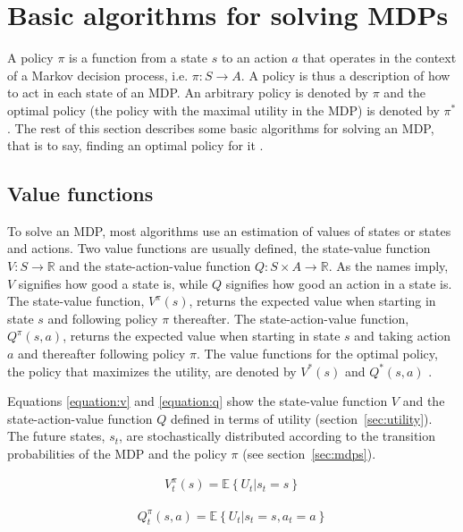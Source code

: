 \section{Basic algorithms for solving MDPs}

A policy $\pi$ is a function from a state $s$ to an action $a$ that operates in
the context of a Markov decision process, i.e. $\pi \colon S \to A$. A policy
is thus a description of how to act in each state of an MDP. An arbitrary
policy is denoted by $\pi$ and the optimal policy (the policy with the maximal
utility in the MDP) is denoted by $\pi^*$. The rest of this section
describes some basic algorithms for solving an MDP, that is to say, finding an optimal
policy for it \parencite{barto1998reinforcement}.

\subsection{Value functions}

To solve an MDP, most algorithms use an estimation of values of states or
states and actions. Two value functions are usually defined, the state-value function $V :
S \to \mathbb R$ and the state-action-value function $Q : S \times A \to
\mathbb R$. As the names imply, $V$ signifies how good a state is, while $Q$
signifies how good an action in a state is. The state-value function,
$V^\pi(s)$, returns the expected value when starting in state $s$ and following
policy $\pi$ thereafter. The state-action-value function, $Q^\pi(s, a)$, returns
the expected value when starting in state $s$ and taking action $a$ and
thereafter following policy $\pi$. The value functions for the optimal policy, the policy
that maximizes the utility, 
are denoted by $V^*(s)$ and $Q^*(s, a)$ \parencite{barto1998reinforcement}. 

Equations \eqref{equation:v} and \eqref{equation:q} show the state-value
function $V$ and the state-action-value function $Q$ defined in terms of
utility (section~\ref{sec:utility}). The future states, $s_t$, are
stochastically distributed according to the transition probabilities of the MDP
and the policy $\pi$ (see section~\ref{sec:mdps}).

\begin{align}
\label{equation:v}
V_t^\pi(s) = \mathbb{E} \left\{
  \left. U_t
  \right\vert s_t = s
\right\}
\end{align}

\begin{align}
\label{equation:q}
Q_t^\pi(s, a) = \mathbb{E} \left\{
  \left. U_t
  \right\vert s_t = s, a_t = a
\right\}
\end{align}


